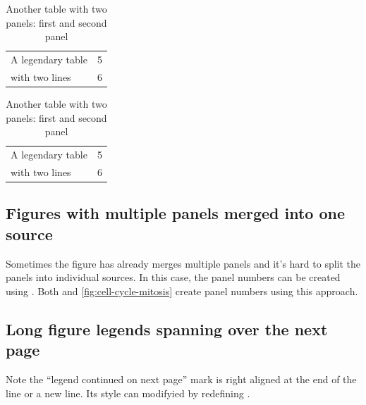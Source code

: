\begin{table}[b]
    \centering
    \caption{Another table with two panels:  first and  second panel}
    \label{tab:subtable-demo}

    \begin{subtable}{0.5\linewidth}
        \centering
        \label{tab:subtab-a}
        \begin{tabular}{lc} \toprule
        A legendary table & 5 \\
        with two lines    & 6 \\ \bottomrule
        \end{tabular}
    \end{subtable}%
    \begin{subtable}{0.5\linewidth}
        \centering
        \label{tab:subtab-b}
        \begin{tabular}{lc} \toprule
        A legendary table & 5 \\
        with two lines    & 6 \\ \bottomrule
        \end{tabular}
    \end{subtable}
\end{table}


\subsection{Figures with multiple panels merged into one source}
Sometimes the figure has already merges multiple panels and it's hard to split the panels into individual sources.
In this case, the panel numbers can be created using .
Both  and \ref{fig:cell-cycle-mitosis} create panel numbers using this approach.


\subsection{Long figure legends spanning over the next page}
Note the ``legend continued on next page'' mark is right aligned at the end of the line or a new line. Its style can modifyied by redefining \cmd{\legendcontdnote}.

